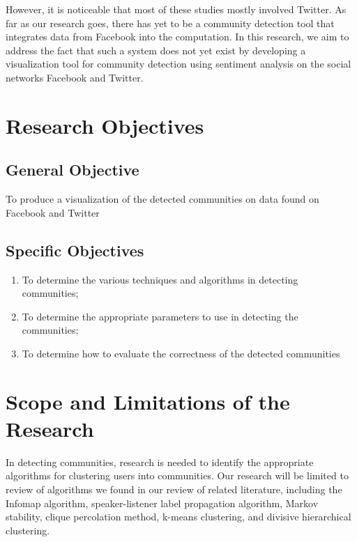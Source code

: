 However, it is noticeable that most of these studies mostly involved Twitter. As far as our research goes, there has yet to be a community detection tool that integrates data from Facebook into the computation. In this research, we aim to address the fact that such a system does not yet exist by developing a visualization tool for community detection using sentiment analysis on the social networks Facebook and Twitter.

\section{Research Objectives}
\label{sec:researchobjectives}

\subsection{General Objective}
\label{sec:generalobjective}

To produce a visualization of the detected communities on data found on Facebook and Twitter

\subsection{Specific Objectives}
\label{sec:specificobjectives}

\begin{enumerate}
	\item To determine the various techniques and algorithms in detecting communities;
	\item To determine the appropriate parameters to use in detecting the communities;
	\item To determine how to evaluate the correctness of the detected communities
\end{enumerate}

\section{Scope and Limitations of the Research}
\label{sec:scopelimitations}

In detecting communities, research is needed to identify the appropriate algorithms for clustering users into communities. Our research will be limited to review of algorithms we found in our review of related literature, including the Infomap algorithm, speaker-listener label propagation algorithm, Markov stability, clique percolation method, k-means clustering, and divisive hierarchical clustering.

